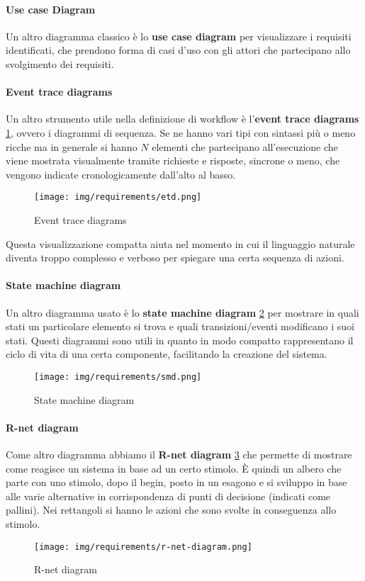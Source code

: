 \paragraph{Use case Diagram}
Un altro diagramma classico è lo \textbf{use case diagram} per visualizzare i
requisiti identificati, che prendono forma di casi d'uso con gli attori che
partecipano allo svolgimento dei requisiti.
\paragraph{Event trace diagrams}
Un altro strumento utile nella definizione di workflow è l'\textbf{event trace
      diagrams} \ref{fig:etd}, ovvero i diagrammi di sequenza. Se ne hanno vari
tipi con sintassi più o meno ricche ma in generale si hanno $N$ elementi che
partecipano all'esecuzione che viene mostrata visualmente tramite richieste e
risposte, sincrone o meno, che vengono indicate cronologicamente dall'alto al basso.
\begin{figure}[!ht]
      \centering
      \texttt{[image: img/requirements/etd.png]}
      \caption{Event trace diagrams}
      \label{fig:etd}
\end{figure}
Questa visualizzazione compatta aiuta nel momento in cui il linguaggio naturale
diventa troppo complesso e verboso per spiegare una certa sequenza di azioni.
\paragraph{State machine diagram}
Un altro diagramma usato è lo \textbf{state machine diagram} \ref{fig:smd} per
mostrare in quali stati un particolare elemento si trova e quali transizioni/eventi
modificano i suoi stati. Questi diagrammi sono utili in quanto in modo compatto
rappresentano il ciclo di vita di una certa componente, facilitando la creazione
del sistema.
\begin{figure}[!ht]
      \centering
      \texttt{[image: img/requirements/smd.png]}
      \caption{State machine diagram}
      \label{fig:smd}
\end{figure}
\paragraph{R-net diagram}
Come altro diagramma abbiamo il \textbf{R-net diagram} \ref{fig:r-net-diagram}
che permette di mostrare come reagisce un sistema in base ad un certo stimolo.
È quindi un albero che parte con uno stimolo, dopo il begin, posto in un esagono
e si sviluppo in base alle varie alternative in corrispondenza di punti di
decisione (indicati come pallini). Nei rettangoli si hanno le azioni che sono
svolte in conseguenza allo stimolo.
\begin{figure}[!ht]
      \centering
      \texttt{[image: img/requirements/r-net-diagram.png]}
      \caption{R-net diagram}
      \label{fig:r-net-diagram}
\end{figure}
